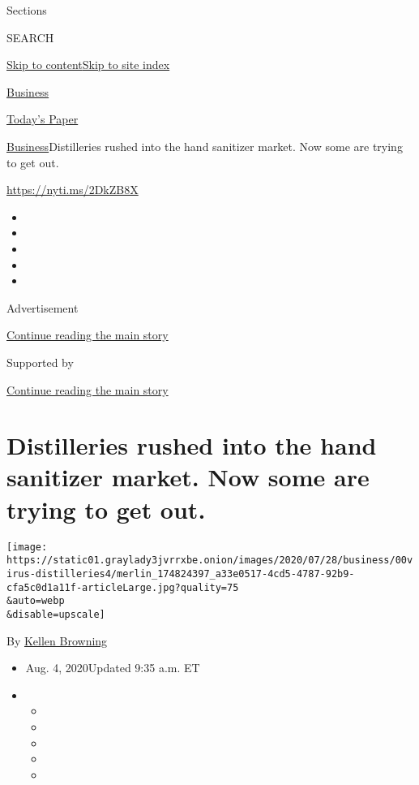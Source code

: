 Sections

SEARCH

\protect\hyperlink{site-content}{Skip to
content}\protect\hyperlink{site-index}{Skip to site index}

\href{https://www.nytimes3xbfgragh.onion/section/business}{Business}

\href{https://myaccount.nytimes3xbfgragh.onion/auth/login?response_type=cookie\&client_id=vi}{}

\href{https://www.nytimes3xbfgragh.onion/section/todayspaper}{Today's
Paper}

\href{/section/business}{Business}\textbar{}Distilleries rushed into the
hand sanitizer market. Now some are trying to get out.

\url{https://nyti.ms/2DkZB8X}

\begin{itemize}
\item
\item
\item
\item
\item
\end{itemize}

Advertisement

\protect\hyperlink{after-top}{Continue reading the main story}

Supported by

\protect\hyperlink{after-sponsor}{Continue reading the main story}

\hypertarget{distilleries-rushed-into-the-hand-sanitizer-market-now-some-are-trying-to-get-out}{%
\section{Distilleries rushed into the hand sanitizer market. Now some
are trying to get
out.}\label{distilleries-rushed-into-the-hand-sanitizer-market-now-some-are-trying-to-get-out}}

\texttt{[image: https://static01.graylady3jvrrxbe.onion/images/2020/07/28/business/00virus-distilleries4/merlin\_174824397\_a33e0517-4cd5-4787-92b9-cfa5c0d1a11f-articleLarge.jpg?quality=75\\\&auto=webp\\\&disable=upscale]}

By \href{https://www.nytimes3xbfgragh.onion/by/kellen-browning}{Kellen
Browning}

\begin{itemize}
\item
  Aug. 4, 2020Updated 9:35 a.m. ET
\item
  \begin{itemize}
  \item
  \item
  \item
  \item
  \item
  \end{itemize}
\end{itemize}

